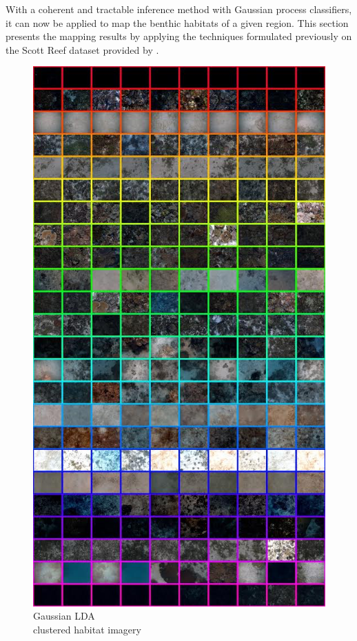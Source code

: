 		With a coherent and tractable inference method with Gaussian process classifiers, it can now be applied to map the benthic habitats of a given region. This section presents the mapping results by applying the techniques formulated previously on the Scott Reef dataset provided by \cite{IMOS}.  

		\begin{figure}
			\centering
				\includegraphics[width=\linewidth]{Figures/label_images.png}
			\caption{Gaussian LDA \\ clustered habitat imagery \\ \citep{Steinberg2015128}}
			\label{Figure:LabelImages}
		\end{figure}
			
